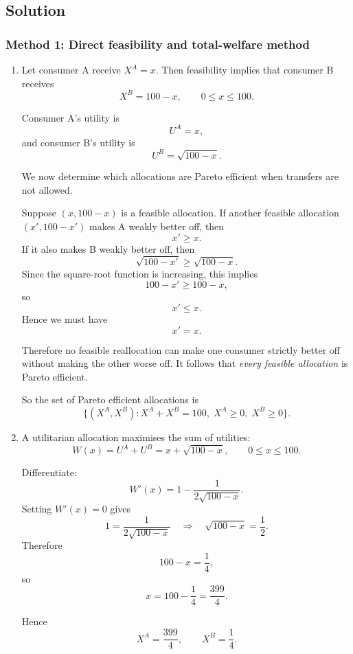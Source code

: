 \documentclass[12pt]{article}
\begin{document}
\newpage
\subsection{Solution}

\subsubsection{Method 1: Direct feasibility and total-welfare method}

\begin{enumerate}[label=(\alph*)]
    \item
    Let consumer A receive \(X^A=x\). Then feasibility implies that consumer B receives
    \[
    X^B=100-x,
    \qquad 0\le x\le 100.
    \]

    Consumer A's utility is
    \[
    U^A=x,
    \]
    and consumer B's utility is
    \[
    U^B=\sqrt{100-x}.
    \]

    We now determine which allocations are Pareto efficient when transfers are not allowed.

    Suppose \((x,100-x)\) is a feasible allocation. If another feasible allocation \((x',100-x')\) makes A weakly better off, then
    \[
    x'\ge x.
    \]
    If it also makes B weakly better off, then
    \[
    \sqrt{100-x'}\ge \sqrt{100-x}.
    \]
    Since the square-root function is increasing, this implies
    \[
    100-x'\ge 100-x,
    \]
    so
    \[
    x'\le x.
    \]
    Hence we must have
    \[
    x'=x.
    \]

    Therefore no feasible reallocation can make one consumer strictly better off without making the other worse off. It follows that \emph{every feasible allocation} is Pareto efficient.

    So the set of Pareto efficient allocations is
    \[
    \boxed{\{(X^A,X^B): X^A+X^B=100,\; X^A\ge 0,\; X^B\ge 0\}.}
    \]

    \item
    A utilitarian allocation maximises the sum of utilities:
    \[
    W(x)=U^A+U^B=x+\sqrt{100-x},
    \qquad 0\le x\le 100.
    \]

    Differentiate:
    \[
    W'(x)=1-\frac{1}{2\sqrt{100-x}}.
    \]
    Setting \(W'(x)=0\) gives
    \[
    1=\frac{1}{2\sqrt{100-x}}
    \quad\Longrightarrow\quad
    \sqrt{100-x}=\frac12.
    \]
    Therefore
    \[
    100-x=\frac14,
    \]
    so
    \[
    x=100-\frac14=\frac{399}{4}.
    \]

    Hence
    \[
    X^A=\frac{399}{4},
    \qquad
    X^B=\frac14.
    \]


\end{enumerate}
\end{document}

